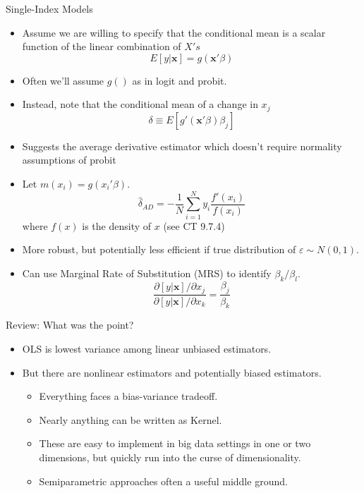 \begin{frame}[allowframebreaks]{Single-Index Models}
   
  \begin{itemize}
  \item Assume we are willing to specify that the conditional mean is a scalar function of the linear combination of $X's$ 
  $$ E \left[ y | \mathbf{x} \right] = g(\mathbf{x}'\beta ) $$ 
  \item Often we'll assume $g()$ as in logit and probit. 
  \item Instead, note that the conditional mean of a change in $x_j$ 
  $$ \delta \equiv E \left[g'(\mathbf{x}'\beta ) \beta_j \right] $$ 
  
  \item Suggests the \alert{average derivative estimator} which doesn't require normality assumptions of probit
  \item Let $m(x_i) = g(x_i'\beta)$. 
  $$ \hat \delta_{AD} = -\frac{1}{N} \sum_{i=1}^N y_i \frac{f'(x_i)}{f(x_i)} $$
  where $f(x)$ is the density of $x$ (see CT 9.7.4)

  \item More robust, but potentially less efficient if true distribution of $\varepsilon \sim N(0,1)$.
 
  \item Can use Marginal Rate of Substitution (MRS) to identify $\beta_k / \beta_l$.
  $$ \frac{ \partial \left[ y | \mathbf{x} \right] / \partial x_j }{ \partial \left[ y | \mathbf{x} \right] / \partial x_k} = \frac{\beta_j}{\beta_k} $$ 
  
   \end{itemize}
\end{frame}

\begin{frame}{Review: What was the point?}
  \begin{itemize}
  \item OLS is lowest variance among linear unbiased estimators.
  \item But there are \alert{nonlinear} estimators and potentially \alert{biased} estimators.
  \begin{itemize}
  \item Everything faces a \alert{bias-variance} tradeoff.
  \item Nearly anything can be written as Kernel.
  \item These are easy to implement in big data settings in one or two dimensions, but quickly run into the curse of dimensionality.
  \item Semiparametric approaches often a useful middle ground.
  \end{itemize}
  \end{itemize}

\end{frame}

